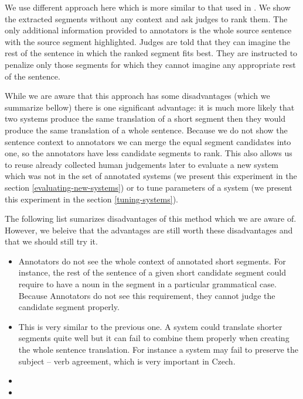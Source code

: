 We use different approach here which is more similar to that used in
. We show the extracted segments without any context
and ask judges to rank them. The only additional information provided to
annotators is the whole source sentence with the source segment highlighted.
Judges are told that they can imagine the rest of the sentence in which the
ranked segment fits best. They are instructed to penalize only those segments
for which they cannot imagine any appropriate rest of the sentence.

While we are aware that this approach has some disadvantages (which we
summarize bellow) there is one significant advantage: it is much more likely
that two systems produce the same translation of a short segment then they
would produce the same translation of a whole sentence. Because we do not show
the sentence context to annotators we can merge the equal segment candidates
into one, so the annotators have less candidate segments to rank. This also
allows us to reuse already collected human judgements later to evaluate a new
system which was not in the set of annotated systems (we present this
experiment in the section \ref{evaluating-new-systems}) or to tune parameters
of a system (we present this experiment in the section \ref{tuning-systems}).

The following list sumarizes disadvantages of this method which we are aware
of. However, we beleive that the advantages are still worth these
disadvantages and that we should still try it.

\begin{itemize}

  \item Annotators do not see the whole context of annotated short segments.
    For instance, the rest of the sentence of a given short candidate segment
    could require to have a noun in the segment in a particular grammatical
    case. Because Annotators do not see this requirement, they cannot judge
    the candidate segment properly.

  \item This is very similar to the previous one. A system could translate
    shorter segments quite well but it can fail to combine them properly when
    creating the whole sentence translation. For instance a system may fail
    to preserve the subject -- verb agreement, which is very important in 
    Czech. 

  \item {}
  \item {}
\end{itemize}

